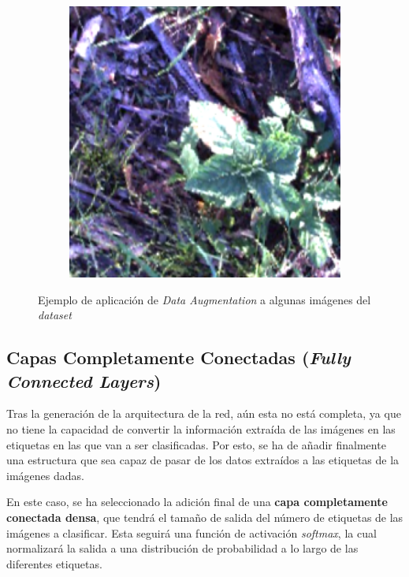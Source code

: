 \begin{figure}[h]
\begin{subfigure}{0.3\textwidth}
        \caption{}
    \end{subfigure}
    \hfill
    \begin{subfigure}{0.3\textwidth}
        \includegraphics[width=\textwidth]{figuras/implementacion/dataset/imagenes_datagen_6.png}
        \caption{}
    \end{subfigure}
    \caption{Ejemplo de aplicación de \textit{Data Augmentation} a algunas imágenes del \textit{dataset}}
    \label{fig:datagen}
\end{figure}

\subsection{Capas Completamente Conectadas (\textit{Fully Connected Layers})}

Tras la generación de la arquitectura de la red, aún esta no está completa, ya que no tiene la capacidad de convertir la información extraída de las imágenes en las etiquetas en las que van a ser clasificadas. Por esto, se ha de añadir finalmente una estructura que sea capaz de pasar de los datos extraídos a las etiquetas de la imágenes dadas.

En este caso, se ha seleccionado la adición final de una \textbf{capa completamente conectada densa}, que tendrá el tamaño de salida del número de etiquetas de las imágenes a clasificar. Esta seguirá una función de activación \textit{softmax}, la cual normalizará la salida a una distribución de probabilidad a lo largo de las diferentes etiquetas.

